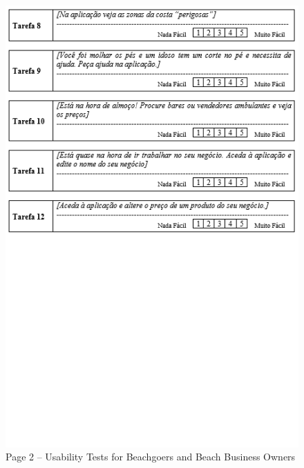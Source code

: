 \begin{figure}[H]
  \centering
  \includegraphics[width=14cm]{figs/UsabilityTest_Beachgoers_2.png}
  \caption{Page 2 – Usability Tests for Beachgoers and Beach Business Owners}
  \label{fig:UsabilityTest_Beachgoers_2}
\end{figure}
